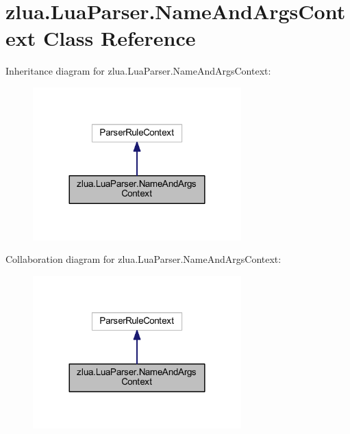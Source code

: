 \hypertarget{classzlua_1_1_lua_parser_1_1_name_and_args_context}{}\section{zlua.\+Lua\+Parser.\+Name\+And\+Args\+Context Class Reference}
\label{classzlua_1_1_lua_parser_1_1_name_and_args_context}


Inheritance diagram for zlua.\+Lua\+Parser.\+Name\+And\+Args\+Context\+:
\nopagebreak
\begin{figure}[H]
\begin{center}
\leavevmode
\includegraphics[width=228pt]{classzlua_1_1_lua_parser_1_1_name_and_args_context__inherit__graph}
\end{center}
\end{figure}


Collaboration diagram for zlua.\+Lua\+Parser.\+Name\+And\+Args\+Context\+:
\nopagebreak
\begin{figure}[H]
\begin{center}
\leavevmode
\includegraphics[width=228pt]{classzlua_1_1_lua_parser_1_1_name_and_args_context__coll__graph}
\end{center}
\end{figure}
